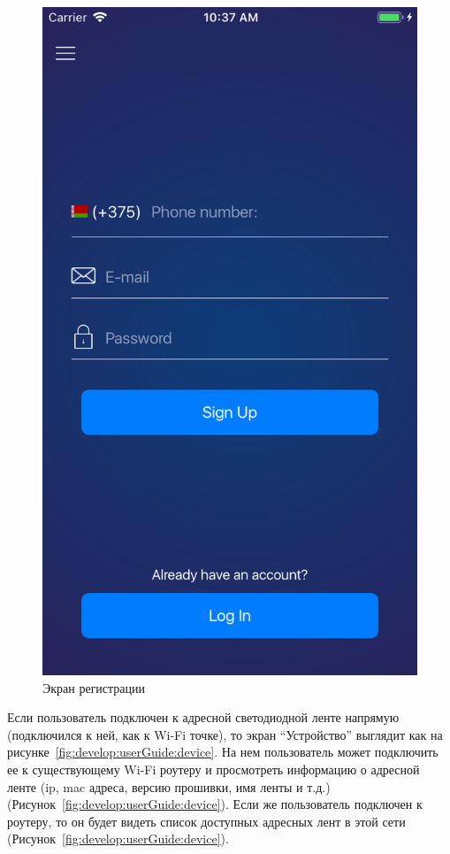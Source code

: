 \begin{figure}[H]
\centering
	\includegraphics[scale=0.2]{figures/userGuide/signUp.png}
	\caption{Экран регистрации}
	\label{fig:develop:userGuide:signUp}
\end{figure}

Если пользователь подключен к адресной светодиодной ленте напрямую (подключился к ней, как к Wi-Fi точке), то экран \enquote{Устройство} выглядит как на рисунке~\ref{fig:develop:userGuide:device}. На нем пользователь может подключить ее к существующему Wi-Fi роутеру и просмотреть информацию о адресной ленте (ip, mac адреса, версию прошивки, имя ленты и т.д.) (Рисунок~\ref{fig:develop:userGuide:device}). Если же пользователь подключен к роутеру, то он будет видеть список доступных адресных лент в этой сети (Рисунок~\ref{fig:develop:userGuide:device}).

